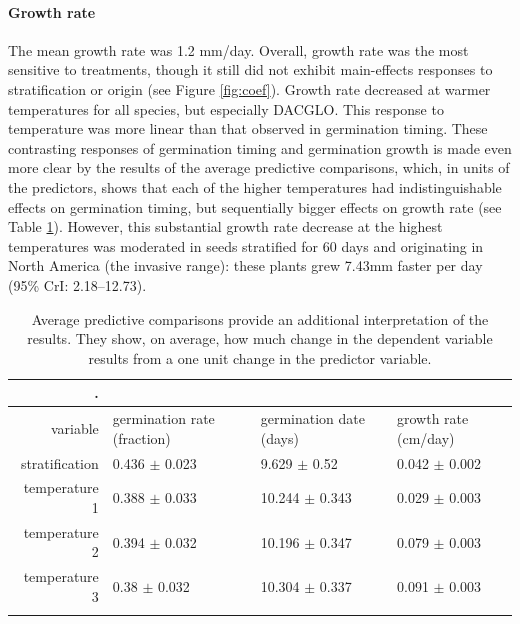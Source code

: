 \documentclass[12pt]{article}\usepackage[]{graphicx}\usepackage[]{color}
\begin{document}
	\paragraph{Growth rate} The mean growth rate was 1.2 mm/day. Overall, growth rate was the most sensitive to treatments, though it still did not exhibit main-effects responses to stratification or origin (see Figure \ref{fig:coef}). Growth rate decreased at warmer temperatures for all species, but especially DACGLO. This response to temperature was more linear than that observed in germination timing. These contrasting responses of germination timing and germination growth is made even more clear by the results of the average predictive comparisons, which, in units of the predictors, shows that each of the higher temperatures had indistinguishable effects on germination timing, but sequentially bigger effects on growth rate (see Table \ref{tab:apc}).  However, this substantial growth rate decrease at the highest temperatures was moderated in seeds stratified for 60 days and originating in North America (the invasive range): these plants grew 7.43mm faster per day (95\% CrI: 2.18--12.73).

\begin{longtable}{rlll}
\caption{Average predictive comparisons provide an additional interpretation of the results. They show, on average, how much change in the dependent variable results from a one unit change in the predictor variable.}.
\label{tab:apc}\\
	\hline
	variable & germination rate (fraction) & germination date (days) & growth rate (cm/day) \\ 
	\hline
	stratification & 0.436 $\pm$ 0.023 & 9.629 $\pm$ 0.52 & 0.042 $\pm$ 0.002 \\ 
	temperature 1 & 0.388 $\pm$ 0.033 & 10.244 $\pm$ 0.343 & 0.029 $\pm$ 0.003 \\ 
	temperature 2 & 0.394 $\pm$ 0.032 & 10.196 $\pm$ 0.347 & 0.079 $\pm$ 0.003 \\ 
	temperature 3 & 0.38 $\pm$ 0.032 & 10.304 $\pm$ 0.337 & 0.091 $\pm$ 0.003 \\ 
	\hline\\
	\hline
\end{longtable}
\end{document}
